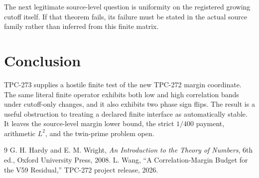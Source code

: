 \documentclass[11pt]{article}
\begin{document}
The next legitimate source-level question is uniformity on the registered
growing cutoff itself.  If that theorem fails, its failure must be stated in
the actual source family rather than inferred from this finite matrix.

\section{Conclusion}

TPC-273 supplies a hostile finite test of the new TPC-272 margin coordinate.
The same literal finite operator exhibits both low and high correlation bands
under cutoff-only changes, and it also exhibits two phase sign flips.  The
result is a useful obstruction to treating a declared finite interface as
automatically stable.  It leaves the source-level margin lower bound, the
strict \(1/400\) payment, arithmetic \(L^2\), and the twin-prime problem open.

\begin{thebibliography}{9}
G. H. Hardy and E. M. Wright, \emph{An Introduction to the Theory of Numbers},
6th ed., Oxford University Press, 2008.
L. Wang, ``A Correlation-Margin Budget for the V59 Residual,'' TPC-272
project release, 2026.
\end{thebibliography}
\end{document}

